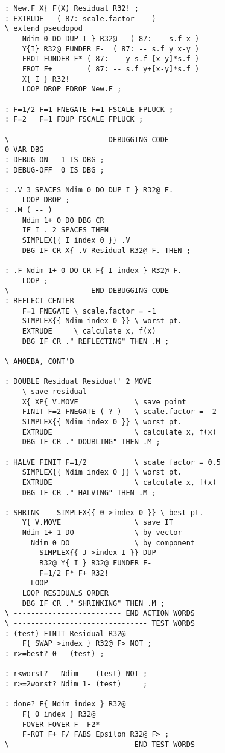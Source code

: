 \begin{lstlisting}
: New.F X{ F(X) Residual R32! ;
: EXTRUDE   ( 87: scale.factor -- )
\ extend pseudopod
    Ndim 0 DO DUP I } R32@   ( 87: -- s.f x )
    Y{I} R32@ FUNDER F-  ( 87: -- s.f y x-y )
    FROT FUNDER F* ( 87: -- y s.f [x-y]*s.f )
    FROT F+        ( 87: -- s.f y+[x-y]*s.f )
    X{ I } R32!
    LOOP DROP FDROP New.F ;

: F=1/2 F=1 FNEGATE F=1 FSCALE FPLUCK ;
: F=2   F=1 FDUP FSCALE FPLUCK ;

\ --------------------- DEBUGGING CODE
0 VAR DBG
: DEBUG-ON  -1 IS DBG ;
: DEBUG-OFF  0 IS DBG ;

: .V 3 SPACES Ndim 0 DO DUP I } R32@ F.
    LOOP DROP ;
: .M ( -- )
    Ndim 1+ 0 DO DBG CR
    IF I . 2 SPACES THEN
    SIMPLEX{{ I index 0 }} .V
    DBG IF CR X{ .V Residual R32@ F. THEN ;

: .F Ndim 1+ 0 DO CR F{ I index } R32@ F.
    LOOP ;
\ ----------------- END DEBUGGING CODE
: REFLECT CENTER
    F=1 FNEGATE \ scale.factor = -1
    SIMPLEX{{ Ndim index 0 }} \ worst pt.
    EXTRUDE     \ calculate x, f(x)
    DBG IF CR ." REFLECTING" THEN .M ;

\ AMOEBA, CONT'D

: DOUBLE Residual Residual' 2 MOVE
    \ save residual
    X{ XP{ V.MOVE             \ save point
    FINIT F=2 FNEGATE ( ? )   \ scale.factor = -2
    SIMPLEX{{ Ndim index 0 }} \ worst pt.
    EXTRUDE                   \ calculate x, f(x)
    DBG IF CR ." DOUBLING" THEN .M ;

: HALVE FINIT F=1/2           \ scale factor = 0.5
    SIMPLEX{{ Ndim index 0 }} \ worst pt.
    EXTRUDE                   \ calculate x, f(x)
    DBG IF CR ." HALVING" THEN .M ;

: SHRINK    SIMPLEX{{ 0 >index 0 }} \ best pt.
    Y{ V.MOVE                 \ save IT
    Ndim 1+ 1 DO              \ by vector
      Ndim 0 DO               \ by component
        SIMPLEX{{ J >index I }} DUP
        R32@ Y{ I } R32@ FUNDER F-
        F=1/2 F* F+ R32!
      LOOP
    LOOP RESIDUALS ORDER
    DBG IF CR ." SHRINKING" THEN .M ;
\ ------------------------- END ACTION WORDS
\ ------------------------------- TEST WORDS
: (test) FINIT Residual R32@
    F{ SWAP >index } R32@ F> NOT ;
: r>=best? 0   (test) ;

: r<worst?   Ndim    (test) NOT ;
: r>=2worst? Ndim 1- (test)     ;

: done? F{ Ndim index } R32@
    F{ 0 index } R32@
    FOVER FOVER F- F2*
    F-ROT F+ F/ FABS Epsilon R32@ F> ;
\ ----------------------------END TEST WORDS


\end{lstlisting}
